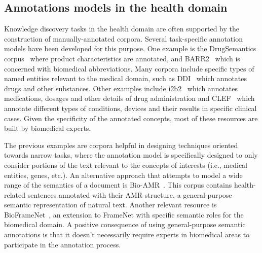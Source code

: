   \subsection{Annotations models in the health domain}\label{sec:health}

  Knowledge discovery tasks in the health domain are often supported by the construction of manually-annotated corpora.
  Several task-specific annotation models have been developed for this purpose. One example is the  {DrugSemantics} corpus~\cite{moreno2017drugsemantics} where product characteristics are annotated, and  {BARR2}~\cite{barr2} which is concerned with biomedical abbreviations.
  Many corpora include specific types of named entities relevant to the medical domain, such as {DDI}~\cite{ddi} which annotates drugs and other substances.
  Other examples include {i2b2}~\cite{i2b2} which annotates medications, dosages and other details of drug administration and  {CLEF}~\cite{clef} which annotate different types of conditions, devices and their results in specific clinical cases.
  Given the specificity of the annotated concepts, most of these resources are built by biomedical experts.

  The previous examples are corpora helpful in designing techniques oriented towards narrow tasks,
  where the annotation model is specifically designed to only consider portions of the text relevant to the concepts of interests (i.e., medical entities, genes, etc.).
  An alternative approach that attempts to model a wide range of the semantics of a document is {Bio-AMR}~\cite{bioamr}.
  This corpus contains health-related sentences annotated with their AMR structure, a general-purpose semantic representation of natural text.
  Another relevant resource is BioFrameNet~\cite{bioframenet}, an extension to FrameNet with specific semantic roles for the biomedical domain.
  A positive consequence of using general-purpose semantic annotations is that it doesn't necessarily require experts in biomedical areas to participate in the annotation process.

